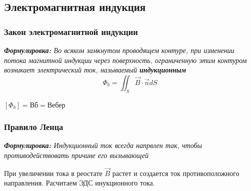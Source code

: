 \documentclass[../main.tex]{subfiles}
\begin{document}
\subsection{Электромагнитная индукция}
\subsubsection{Закон электромагнитной индукции}
\textit{\textbf{Формулировка:} Во всяком замкнутом проводящем контуре, при изменении потока магнитной индукции через поверхность,
    ограниченную этим контуром возникает электрический ток, называемый \textbf{индукционным}}
\[\Phi_b = \iint_{S} \vec B \cdot \vec n dS\]
\begin{center}
    $[\Phi_b] = \text{Вб} = \text{Вебер}$
\end{center}
\subsubsection{Правило Ленца}
\textit{\textbf{Формулировка:} Индукционный ток всегда напрвлен так, чтобы противодействовать причине его вызывающей}

\vspace{5px}

При увеличении тока в реостате $\vec B$ растет и создается ток противоположного направления. Расчитаем ЭДС инукционного тока.
\end{document}
